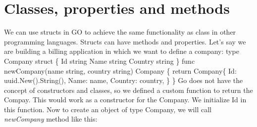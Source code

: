 \documentclass[12pt,a4paper]{report}
\begin{document}
\section*{Classes, properties and methods}
We can use structs in GO to achieve the same functionality as class in
other programming languages. Structs can have methods and properties.
Let's say we are building a billing application in which we want to define a company:
type Company struct \{\newline
	\indent\indent Id      string\newline
	\indent\indent Name    string\newline
	\indent\indent Country string\newline
\}\newline
\newline
func newCompany(name string, country string) Company \{
	\newline\indent return Company\{
		\newline\indent\indent Id:      uuid.New().String(),
		\newline\indent\indent Name:    name,
		\newline\indent\indent Country: country,
    \newline\indent\}
    \newline\}
\newline\newline
Go does not have the concept of constructors and classes, so we defined a
custom function to return the Compay. This would work as a constructor
for the Company. We initialize Id in this function.
Now to create an object of type Company, we will call \textit{newCompany} method
like this:
\textborn
\end{document}
